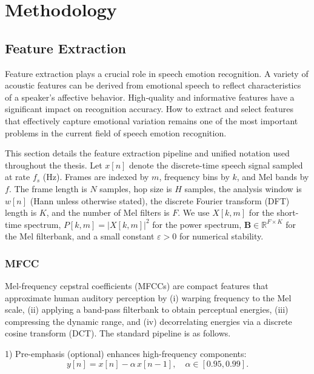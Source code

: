 
\chapter{Methodology}


\section{Feature Extraction}
Feature extraction plays a crucial role in speech emotion recognition. A variety of acoustic features can be derived from emotional speech to reflect characteristics of a speaker’s affective behavior. High‑quality and informative features have a significant impact on recognition accuracy. How to extract and select features that effectively capture emotional variation remains one of the most important problems in the current field of speech emotion recognition.

This section details the feature extraction pipeline and unified notation used throughout the thesis. Let \(x[n]\) denote the discrete-time speech signal sampled at rate \(f_s\) (Hz). Frames are indexed by \(m\), frequency bins by \(k\), and Mel bands by \(f\). The frame length is \(N\) samples, hop size is \(H\) samples, the analysis window is \(w[n]\) (Hann unless otherwise stated), the discrete Fourier transform (DFT) length is \(K\), and the number of Mel filters is \(F\). We use \(X[k,m]\) for the short-time spectrum, \(P[k,m] = |X[k,m]|^2\) for the power spectrum, \(\mathbf{B} \in \mathbb{R}^{F\times K}\) for the Mel filterbank, and a small constant \(\varepsilon>0\) for numerical stability.



\subsection{MFCC}

Mel-frequency cepstral coefficients (MFCCs) \cite{davis1980comparison} are compact features that approximate human auditory perception by (i) warping frequency to the Mel scale, (ii) applying a band-pass filterbank to obtain perceptual energies, (iii) compressing the dynamic range, and (iv) decorrelating energies via a discrete cosine transform (DCT). The standard pipeline is as follows.

1) Pre-emphasis (optional) enhances high-frequency components:
\begin{equation}\label{eq:preemphasis}
y[n] = x[n] - \alpha\, x[n-1], \quad \alpha \in [0.95, 0.99].
\end{equation}

